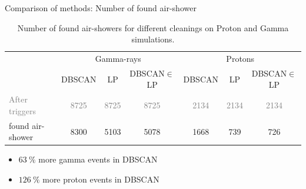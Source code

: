 \begin{frame}{Comparison of methods: Number of found air-shower}
      \centering%
      \begin{table}
        \centering%
        \begin{tabular}{l
                        c
                        c
                        c |
                        c
                        c
                        c}
          \hline
          \multirow{2}{*}{}
              & \multicolumn{3}{c}{Gamma-rays}
                  & \multicolumn{3}{c}{Protons} \\             \cline{2-7}
          & DBSCAN & LP & DBSCAN$\in$LP & DBSCAN & LP & DBSCAN$\in$LP \\  \hline
          \textcolor{gray}{After triggers}  & \textcolor{gray}{\num{8725}} & \textcolor{gray}{\num{8725}} & \textcolor{gray}{\num{8725}} & \textcolor{gray}{\num{2134}} & \textcolor{gray}{\num{2134}} & \textcolor{gray}{\num{2134}} \\
          found air-shower & \num{8300} & \num{5103} & \num{5078} & \num{1668} & \num{739} & \num{726} \\
          \bottomrule
        \end{tabular}
        \caption{Number of found air-showers for different cleanings on Proton and Gamma simulations.}
      \end{table}
      \begin{itemize}
        \item $\SI{63}{\percent}$ more gamma events in DBSCAN
        \item $\SI{126}{\percent}$ more proton events in DBSCAN
      \end{itemize}
\end{frame}

